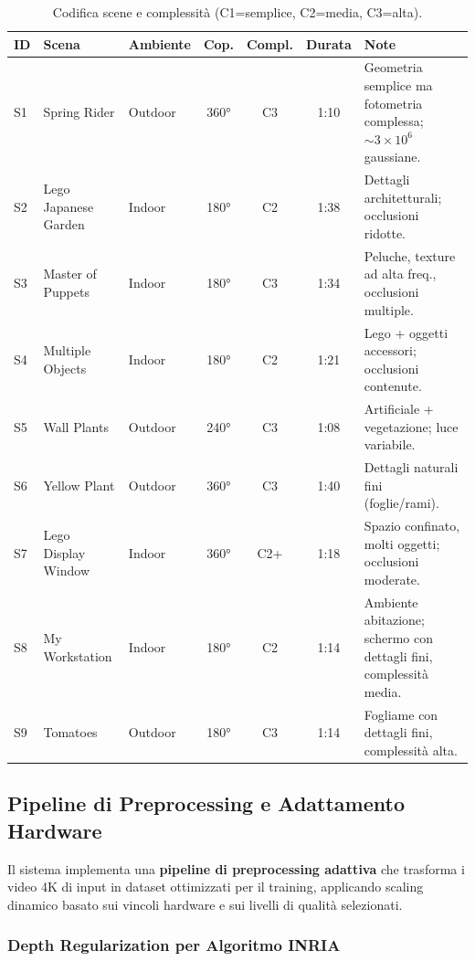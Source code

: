 \begin{table}[htbp]
	\centering
	\footnotesize
	\begin{tabularx}{\textwidth}{l l l c c c X}
		\toprule
		ID & Scena & Ambiente & Cop. & Compl. & Durata & Note \\
		\midrule
		S1 & Spring Rider & Outdoor & 360° & C3 & 1:10 & Geometria semplice ma fotometria complessa; \(\sim 3\times10^6\) gaussiane. \\
		S2 & Lego Japanese Garden & Indoor & 180° & C2 & 1:38 & Dettagli architetturali; occlusioni ridotte. \\
		S3 & Master of Puppets & Indoor & 180° & C3 & 1:34 & Peluche, texture ad alta freq., occlusioni multiple. \\
		S4 & Multiple Objects & Indoor & 180° & C2 & 1:21 & Lego + oggetti accessori; occlusioni contenute. \\
		S5 & Wall Plants & Outdoor & 240° & C3 & 1:08 & Artificiale + vegetazione; luce variabile. \\
		S6 & Yellow Plant & Outdoor & 360° & C3 & 1:40 & Dettagli naturali fini (foglie/rami). \\
		S7 & Lego Display Window & Indoor & 360° & C2+ & 1:18 & Spazio confinato, molti oggetti; occlusioni moderate. \\
		S8 & My Workstation & Indoor & 180° & C2 & 1:14 & Ambiente abitazione; schermo con dettagli fini, complessità media. \\
		S9 & Tomatoes & Outdoor & 180° & C3 & 1:14 & Fogliame con dettagli fini, complessità alta. \\
		\bottomrule
	\end{tabularx}
	\caption{Codifica scene e complessità (C1=semplice, C2=media, C3=alta).}
\end{table}



\subsection{Pipeline di Preprocessing e Adattamento Hardware}
\label{subsec:pipeline_preprocessing}

Il sistema implementa una \textbf{pipeline di preprocessing adattiva} che trasforma i video 4K di input in dataset ottimizzati per il training, applicando scaling dinamico basato sui vincoli hardware e sui livelli di qualità selezionati.

\subsubsection{Depth Regularization per Algoritmo INRIA}

